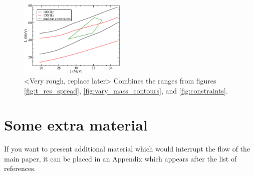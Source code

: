 \documentclass[fleqn,usenatbib]{mnras}
\begin{document}
\begin{figure}
\centering
\includegraphics[width=0.45\textwidth,angle=0]{K_M_tres_ranges.pdf}
\caption{<Very rough, replace later> Combines the ranges from figures \ref{fig:t_res_spread}, \ref{fig:vary_mass_contours}, and \ref{fig:constraints}.} %
\label{fig:all_constraints}
\end{figure}























\appendix

\section{Some extra material}

If you want to present additional material which would interrupt the flow of the main paper,
it can be placed in an Appendix which appears after the list of references.



\bsp	%
\label{lastpage}
\end{document}
